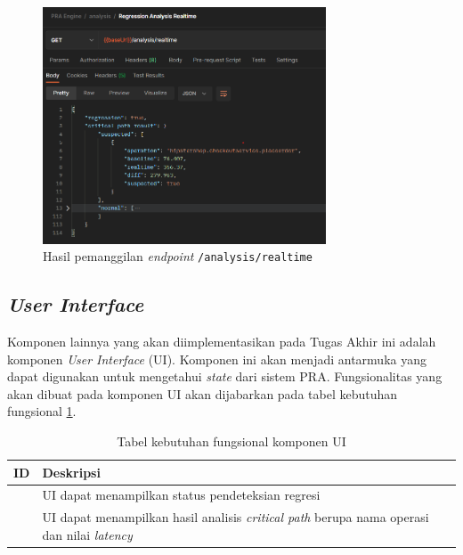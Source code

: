 \begin{figure}[h!]
	\centering
	\includegraphics[width=0.75\textwidth]{resources/ch4/result_analysis_realtime.png}
	\caption{Hasil pemanggilan \textit{endpoint} \texttt{/analysis/realtime}}
	\label{api_analysis_realtime}
\end{figure} 
\pagebreak


\subsection{\textit{User Interface}}
Komponen lainnya yang akan diimplementasikan pada Tugas Akhir ini adalah komponen \textit{User Interface} (UI). Komponen ini akan menjadi antarmuka yang dapat digunakan untuk mengetahui \textit{state} dari sistem PRA. Fungsionalitas yang akan dibuat pada komponen UI akan dijabarkan pada tabel kebutuhan  fungsional \ref{ui-functional}.
\begin{small}
	\begin{longtable}{ | p{3cm} | p{9cm} | }
		\caption{Tabel kebutuhan fungsional komponen UI}
		\label{ui-functional}                                                           
		\\ \hline
		\centering\bfseries{ID} & \centering\bfseries{Deskripsi} \tabularnewline \hline
		\endfirsthead
		\centering{UI-1} & UI dapat menampilkan status pendeteksian regresi  \\ \hline
		\centering{UI-2} & UI dapat menampilkan hasil analisis \textit{critical path} berupa nama operasi dan nilai \textit{latency} \\ \hline

	\end{longtable}
\end{small}

